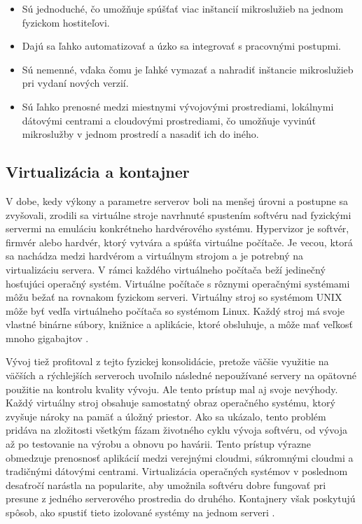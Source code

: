 \begin{itemize}
\item Sú jednoduché, čo umožňuje spúšťať viac inštancií mikroslužieb na jednom fyzickom hostiteľovi.
\item Dajú sa ľahko automatizovať a úzko sa integrovať s pracovnými postupmi.
\item Sú nemenné, vďaka čomu je ľahké vymazať a nahradiť inštancie mikroslužieb pri vydaní nových verzií.
\item Sú ľahko prenosné medzi miestnymi vývojovými prostrediami, lokálnymi dátovými centrami a cloudovými prostrediami, čo umožňuje vyvinúť mikroslužby v jednom prostredí a nasadiť ich do iného.
\end{itemize}

\subsection{Virtualizácia a kontajner}

V dobe, kedy výkony a parametre serverov boli na menšej úrovni a postupne sa zvyšovali, zrodili sa virtuálne stroje navrhnuté spustením softvéru nad fyzickými servermi na emuláciu konkrétneho hardvérového systému. Hypervizor je softvér, firmvér alebo hardvér, ktorý vytvára a spúšťa virtuálne počítače. Je vecou, ktorá sa nachádza medzi hardvérom a virtuálnym strojom a je potrebný na virtualizáciu servera. V rámci každého virtuálneho počítača beží jedinečný hosťujúci operačný systém. Virtuálne počítače s rôznymi operačnými systémami môžu bežať na rovnakom fyzickom serveri. Virtuálny stroj so systémom UNIX môže byť vedľa virtuálneho počítača so systémom Linux. Každý stroj má svoje vlastné binárne súbory, knižnice a aplikácie, ktoré obsluhuje, a môže mať veľkosť mnoho gigabajtov \cite{containersvsvirtual1}.

Vývoj tiež profitoval z tejto fyzickej konsolidácie, pretože väčšie využitie na väčších a rýchlejších serveroch uvoľnilo následné nepoužívané servery na opätovné použitie na kontrolu kvality vývoju. Ale tento prístup mal aj svoje nevýhody. Každý virtuálny stroj obsahuje samostatný obraz operačného systému, ktorý zvyšuje nároky na pamäť a úložný priestor. Ako sa ukázalo, tento problém pridáva na zložitosti všetkým fázam životného cyklu vývoja softvéru, od vývoja až po testovanie na výrobu a obnovu po havárii. Tento prístup výrazne obmedzuje prenosnosť aplikácií medzi verejnými cloudmi, súkromnými cloudmi a tradičnými dátovými centrami. Virtualizácia operačných systémov v poslednom desaťročí narástla na popularite, aby umožnila softvéru dobre fungovať pri presune z jedného serverového prostredia do druhého. Kontajnery však poskytujú spôsob, ako spustiť tieto izolované systémy na jednom serveri \cite{containersvsvirtual2}.

